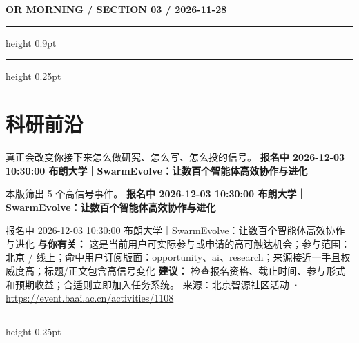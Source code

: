\documentclass[10.5pt]{ctexart}
\begin{document}
\newpage
{\small\bfseries OR MORNING / SECTION 03 / 2026-11-28}
\vspace{2mm}
\hrule height 0.9pt
\vspace{1.5mm}
\hrule height 0.25pt
\vspace{4mm}
\section*{科研前沿}
{\color{ormuted} 真正会改变你接下来怎么做研究、怎么写、怎么投的信号。}
\vspace{2mm}
{\LARGE\bfseries 报名中 2026-12-03 10:30:00 布朗大学｜SwarmEvolve：让数百个智能体高效协作与进化}\par
\vspace{1mm}
{\color{ormuted} 本版筛出 5 个高信号事件。}
\vspace{3mm}
{\Large\bfseries 报名中 2026-12-03 10:30:00 布朗大学｜SwarmEvolve：让数百个智能体高效协作与进化}\par
报名中 2026-12-03 10:30:00 布朗大学｜SwarmEvolve：让数百个智能体高效协作与进化
\textbf{与你有关：} 这是当前用户可实际参与或申请的高可触达机会；参与范围：北京 / 线上；命中用户订阅版面：opportunity、ai、research；来源接近一手且权威度高；标题/正文包含高信号变化
\textbf{建议：} 检查报名资格、截止时间、参与形式和预期收益；合适则立即加入任务系统。
{\footnotesize\color{ormuted} 来源：北京智源社区活动 · \url{https://event.baai.ac.cn/activities/1108}}
\vspace{4mm}
\hrule height 0.25pt
\vspace{3mm}
\end{document}
